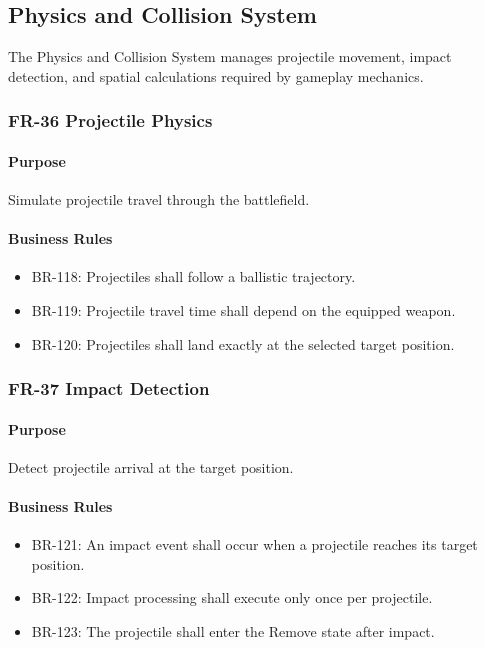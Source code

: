 \documentclass[11pt,a4paper]{article}
\begin{document}
\subsection{Physics and Collision System}

The Physics and Collision System manages projectile movement, impact detection,
and spatial calculations required by gameplay mechanics.

\subsubsection{FR-36 Projectile Physics}

\paragraph{Purpose}
Simulate projectile travel through the battlefield.

\paragraph{Business Rules}
\begin{itemize}
  \item BR-118: Projectiles shall follow a ballistic trajectory.
  \item BR-119: Projectile travel time shall depend on the equipped weapon.
  \item BR-120: Projectiles shall land exactly at the selected target position.
\end{itemize}

\subsubsection{FR-37 Impact Detection}

\paragraph{Purpose}
Detect projectile arrival at the target position.

\paragraph{Business Rules}
\begin{itemize}
  \item BR-121: An impact event shall occur when a projectile reaches its target
        position.
  \item BR-122: Impact processing shall execute only once per projectile.
  \item BR-123: The projectile shall enter the Remove state after impact.
\end{itemize}
\end{document}
